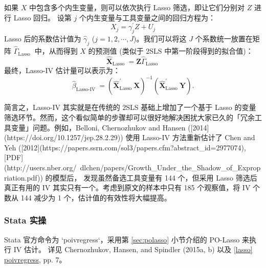 {如果 $X$ 中包含多个内生变量，则可以依次执行 Lasso 筛选，即让它们分别对 $Z$ 进行 Lasso 回归。
设第 $j$ 个内生变量与工具变量之间的回归方程为：
$$X_{j}=\gamma_{j}^{\prime}Z+U_{j}$$
Lasso 后的系数估计值为 $\widehat{\gamma}_{j}$ ($j=1,2,\cdots,J$)。我们可以将这 $J$ 个系数统一放置在矩阵 $\widehat{\Gamma}_{\text {Lasso }}$ 中，从而得到 $X$ 的预测值 (类似于 2SLS 中第一阶段得到的拟合值)：
$$\widehat{\boldsymbol{X}}_{\text {Lasso }}=\boldsymbol{Z} \widehat{\Gamma}_{\text {Lasso }}$$
最终，Lasso-IV 估计量可以表示为：
$$
\widehat{\beta}_{\text {Lasso-IV }}=\left(\widehat{\boldsymbol{X}}_{\text {Lasso }}^{\prime} \boldsymbol{X}\right)^{-1}\left(\widehat{\boldsymbol{X}}_{\text {Lasso }}^{\prime} \boldsymbol{Y}\right) .
$$

简言之，Lasso-IV 其实就是在传统的 2SLS 基础上增加了一个基于 Lasso 的变量筛选环节。然而，这个看似简单的步骤却可以很好地解决困扰大家已久的「冗余工具变量」问题。例如，Belloni, Chernozhukov and Hansen ([2014](https://doi.org/10.1257/jep.28.2.29))
使用 Lasso-IV 方法重新估计了 Chen and Yeh ([2012](https://papers.ssrn.com/sol3/papers.cfm?abstract_id=2977074), [PDF](http://users.nber.org/~dlchen/papers/Growth_Under_the_Shadow_of_Expropriation.pdf)) 的模型后，
发现虽然备选工具变量有 144 个，但采用 Lasso 筛选后真正有用的 IV 其实只有一个。考虑到原文的样本中只有 185 个观察值，将 IV 个数从 144 减少为 1 个，估计值的有效性将大幅提高。


\subsubsection{Stata 实操}
Stata 官方命令为 `poivregress`，采用第 \ref{sec:polasso} 小节介绍的 PO-Lasso 来执行 IV 估计。
详见 Chernozhukov, Hansen, and Spindler (2015a, b) 以及 \href{https://www.stata.com/manuals/lassopoivregress.pdf}{[lasso] poivregress}, pp. 7。

}
